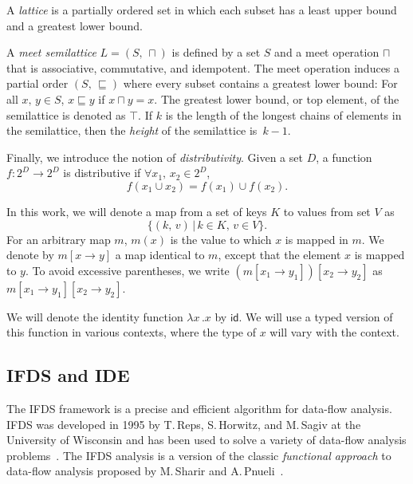 A \textit{lattice} is a partially ordered set in which each subset has a least upper bound and a greatest lower bound.

A \textit{meet semilattice} $L=(S,\,\sqcap)$ is defined by a set $S$ and a meet operation $\sqcap$ that is  associative, commutative, and idempotent.
  The meet operation induces a partial order $(S,\,\sqsubseteq)$ where every subset contains  a greatest lower bound: For all $x,\,y\in S$, $x\sqsubseteq y$ if $x\sqcap y=x$. The greatest lower bound, or top element, of the semilattice is denoted as $\top$.
  If $k$ is the length of the longest chains of elements in the semilattice, then the \textit{height} of the semilattice is~$k-1$.

Finally, we introduce the notion of \textit{distributivity}. Given a set $D$, a function $f:2^D\to2^D$ is distributive if $\forall x_1,\,x_2\in 2^D$,
\begin{equation}
  f(x_1\cup x_2)=f(x_1)\cup f(x_2).
\end{equation}

In this work, we will denote a map from a set of keys $K$ to values from set $V$ as
\begin{equation}
  \{(k,\,v)\,|\,k\in K,\,v\in V\}.
\end{equation}
For an arbitrary map $m$,  $m(x)$ is the value to which $x$ is mapped in $m$. We denote by $m[x\to y]$ a map identical to $m$, except that the element $x$ is mapped to $y$.
To avoid excessive parentheses, we write $\left(m[x_1\to y_1]\right)[x_2\to y_2]$ as $m[x_1\to y_1][x_2\to y_2]$.

We will denote the identity function $\lambda x\,.x$ by $\textsf{id}$.
We will use a typed version of this function in various contexts, where the type of $x$ will vary with
the context.

\subsection{IFDS and IDE}
The IFDS framework is a precise and efficient algorithm for data-flow analysis. IFDS was developed in 1995 by T.\,Reps, S.\,Horwitz, and M.\,Sagiv at the University of Wisconsin and has been used to solve a variety of data-flow analysis problems~\cite{bodden2013spl,naeem2008typestate,DBLP:conf/birthday/KreikerRRSWY13,tripp2009taj}. The IFDS analysis is a version of the classic \textit{functional approach} to data-flow analysis proposed by M.\,Sharir and A.\,Pnueli~\cite{pnueli1981two}.

